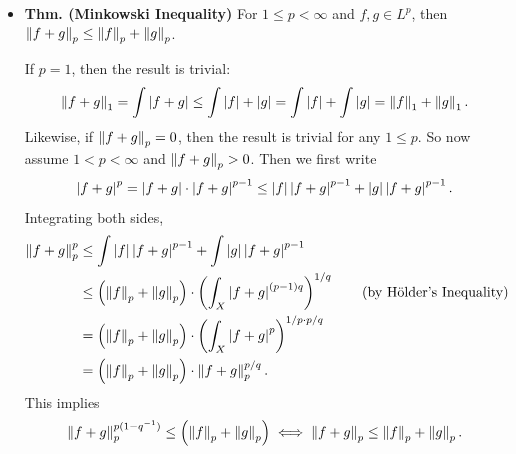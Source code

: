 \documentclass{article}
\begin{document}
\begin{itemize}
\begin{solutions}
		\begin{equation}
			\abs{fg} \leq p^{-1}\abs{f}^{p} + q^{-1}\abs{g}.
		\end{equation}	
		Integrating both sides, one obtains 
		\begin{equation}
			\norm{fg}_{1} \leq  p^{-1}\norm{f}_{p} + q^{-1}\norm{g}_{q} = p^{-1} + q^{-1} = 1 = \norm{f}_{p}\norm{g}_{q}. 
		\end{equation}
		Equality holds here iff equality holds in H\"older's lemma; i.e., $|f|^{p} = |q|^{q}$ $\mu$-a.e. 
	\end{solutions}
	\item \textbf{Thm. (Minkowski Inequality)} For $1 \leq p < \infty$ and $f, g \in L^{p}$, then $\left\Vert f + g \right\Vert_{p}\leq \left\Vert f \right\Vert_{p} + \left\Vert g \right\Vert_{p}$. \newline 
	\begin{solutions} 
		If $p = 1$, then the result is trivial: 
		\begin{equation}
			\left\Vert f + g \right\Vert_{1} = \int \left| f + g \right| \leq \int \left| f \right| + \left| g \right| = \int \left| f \right| + \int \left| g \right| = \left\Vert f \right\Vert_{1} + \left\Vert g \right\Vert_{1}. 
		\end{equation}
		Likewise, if $\left\Vert f + g \right\Vert_{p} =0$, then the result is trivial for any $1 \leq p$. So now assume $1 < p < \infty$ and $\left\Vert f + g \right\Vert_{p} > 0$. Then we first write 
		\begin{equation}
			\left| f + g \right|^{p} = \left| f + g \right| \cdot \left| f + g \right|^{p -1} \leq \left| f \right|\left| f + g \right|^{p - 1} + \left| g \right|\left| f + g \right|^{p - 1}. 
		\end{equation}
		Integrating both sides, 
		\begin{align}
			\begin{split}
				\left\Vert f + g \right\Vert^{p}_{p} &\leq \int \left| f \right|\left| f + g \right|^{p - 1} + \int \left| g \right|\left| f + g \right|^{p - 1} \\
				&\leq \left(\left\Vert f \right\Vert_{p} + \left\Vert g \right\Vert_{p}\right) \cdot \left(\int_{X}\left| f + g \right|^{(p - 1)q}\right)^{1/q} \qquad \text{(by H\"older's Inequality)} \\
				&= \left(\left\Vert f \right\Vert_{p} + \left\Vert g \right\Vert_{p}\right) \cdot \left(\int_{X}\left| f + g \right|^{p}\right)^{1/p\cdot p/q} \\
				&= \left(\left\Vert f \right\Vert_{p} + \left\Vert g \right\Vert_{p}\right) \cdot \left\Vert f + g \right\Vert_{p}^{p/q}. 
			\end{split}
		\end{align}
		This implies 
		\begin{equation}
			\norm{f + g}_{p}^{p(1 - q^{-1})} \leq \left(\norm{f}_{p} + \norm{g}_{p}\right) \iff \norm{f + g}_{p} \leq \norm{f}_{p} + \norm{g}_{p}.

\end{equation}
\end{solutions}
\end{itemize}
\end{document}

